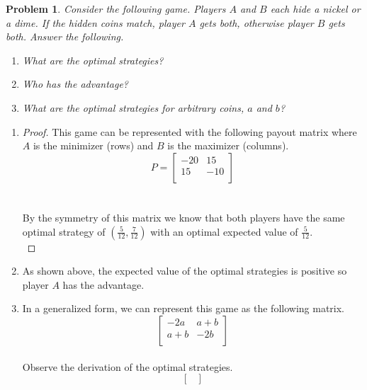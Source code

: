 \documentclass[12pt,oneside]{amsart}
\numberwithin{equation}{section}
\numberwithin{figure}{section}
\theoremstyle{plain}
\newtheorem{prob}{Problem}
\theoremstyle{definition}
\begin{document}
\begin{prob}
Consider the following game. Players $A$ and $B$ each hide a nickel or a dime. If 
the hidden coins match, player $A$ gets both, otherwise player $B$ gets both. 
Answer the following. \\
\begin{enumerate}
  \item What are the optimal strategies? \\
  \item Who has the advantage? \\
  \item What are the optimal strategies for arbitrary coins, $a$ and $b$? \\
\end{enumerate}
\end{prob}
\begin{enumerate}
  \item \begin{proof}
    This game can be represented with the following payout matrix where $A$ is the 
    minimizer (rows) and $B$ is the maximizer (columns). \\
    \[P = \begin{bmatrix}
      -20  & 15 \\
      15 & -10  \\
    \end{bmatrix}\] \\ \pagebreak \\
    By the symmetry of this matrix we know that both players have the same 
    optimal strategy of $(\frac{5}{12},\frac{7}{12})$ with an optimal expected 
    value of $\frac{5}{12}$. \\
    \end{proof}
  \item As shown above, the expected value of the optimal strategies is positive 
    so player $A$ has the advantage. \\
  \item In a generalized form, we can represent this game as the following matrix. \\
    \[\begin{bmatrix}
      -2a & a+b \\
      a+b & -2b \\
    \end{bmatrix}\] \\
    Observe the derivation of the optimal strategies. \\
    \[\begin{bmatrix}

\end{bmatrix}\]
\end{enumerate}
\end{document}
